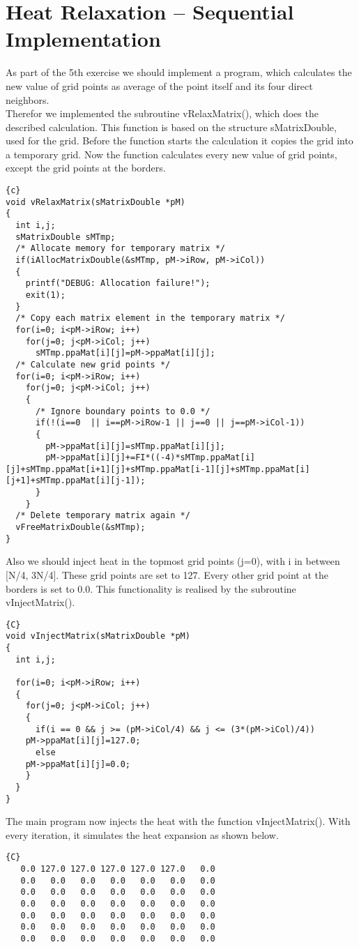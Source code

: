 \documentclass{article}
\newcommand{\enterProblemHeader}[1]{
}
\newcommand{\exitProblemHeader}[1]{
}
\newcounter{homeworkProblemCounter} %
\newcommand{\homeworkProblemName}{}
\newenvironment{homeworkProblem}[1][Problem \arabic{homeworkProblemCounter}]{ %
\stepcounter{homeworkProblemCounter} %
\renewcommand{\homeworkProblemName}{#1} %
\section{\homeworkProblemName} %
}{
}
\begin{document}
\begin{homeworkProblem}[Heat Relaxation – Sequential Implementation]
As part of the 5th exercise we should implement a program, which calculates the new 
value of grid points as average of the point itself and its four direct neighbors.
\\
Therefor we implemented the subroutine vRelaxMatrix(), which does the described
calculation. This function is based on the structure sMatrixDouble, used for the grid.
Before the function starts the calculation it copies the grid into a temporary grid.
Now the function calculates every new value of grid points, except the grid points
at the borders.
\begin{lstlisting}{c}
void vRelaxMatrix(sMatrixDouble *pM)
{
  int i,j;
  sMatrixDouble sMTmp;
  /* Allocate memory for temporary matrix */
  if(iAllocMatrixDouble(&sMTmp, pM->iRow, pM->iCol))
  {
    printf("DEBUG: Allocation failure!");
    exit(1);
  }
  /* Copy each matrix element in the temporary matrix */
  for(i=0; i<pM->iRow; i++)
    for(j=0; j<pM->iCol; j++)
      sMTmp.ppaMat[i][j]=pM->ppaMat[i][j];
  /* Calculate new grid points */
  for(i=0; i<pM->iRow; i++)
    for(j=0; j<pM->iCol; j++)
    {
      /* Ignore boundary points to 0.0 */
      if(!(i==0  || i==pM->iRow-1 || j==0 || j==pM->iCol-1))
      {
        pM->ppaMat[i][j]=sMTmp.ppaMat[i][j];
        pM->ppaMat[i][j]+=FI*((-4)*sMTmp.ppaMat[i][j]+sMTmp.ppaMat[i+1][j]+sMTmp.ppaMat[i-1][j]+sMTmp.ppaMat[i][j+1]+sMTmp.ppaMat[i][j-1]);
      }
    }
  /* Delete temporary matrix again */
  vFreeMatrixDouble(&sMTmp);
}
\end{lstlisting}
Also we should inject heat in the topmost grid points (j=0), with i in between
[N/4, 3N/4]. These grid points are set to 127. Every other grid point at the
borders is set to 0.0. This functionality is realised by the subroutine vInjectMatrix().
\begin{lstlisting}{C}
void vInjectMatrix(sMatrixDouble *pM)
{
  int i,j;
  
  for(i=0; i<pM->iRow; i++)
  {
    for(j=0; j<pM->iCol; j++)
    {
      if(i == 0 && j >= (pM->iCol/4) && j <= (3*(pM->iCol)/4))
	pM->ppaMat[i][j]=127.0;
      else
	pM->ppaMat[i][j]=0.0;
    }
  }
}
\end{lstlisting}
The main program now injects the heat with the function vInjectMatrix(). With every
iteration, it simulates the heat expansion as shown below.
\begin{lstlisting}{C}
   0.0 127.0 127.0 127.0 127.0 127.0   0.0
   0.0   0.0   0.0   0.0   0.0   0.0   0.0
   0.0   0.0   0.0   0.0   0.0   0.0   0.0
   0.0   0.0   0.0   0.0   0.0   0.0   0.0
   0.0   0.0   0.0   0.0   0.0   0.0   0.0
   0.0   0.0   0.0   0.0   0.0   0.0   0.0
   0.0   0.0   0.0   0.0   0.0   0.0   0.0


\end{lstlisting}
\end{homeworkProblem}
\end{document}
